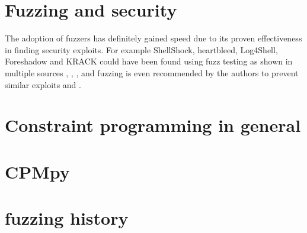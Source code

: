 \section{Fuzzing and security}
The adoption of fuzzers has definitely gained speed due to its proven effectiveness in finding security exploits. For example ShellShock, heartbleed, Log4Shell, Foreshadow and KRACK could have been found using fuzz testing as shown in multiple sources \cite{shellchockViaFuzzing}, \cite{heartbleedViaFuzzing}, \cite{Log4ShellViaFuzzing},  \cite{34ForeshadowViaFuzz} and fuzzing is even recommended by the authors to prevent similar exploits \cite{33KrackViaFuzz} and \cite{35ForeshadowFuzzRecom}.


\section{Constraint programming in general}

\section{CPMpy}

\section{fuzzing history}


